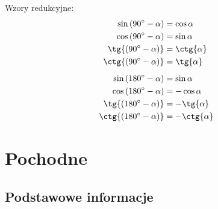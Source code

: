 \documentclass[10pt, twoside, fleqn]{article}
\begin{document}
		Wzory redukcyjne:
			\begin{align*}
				\sin{(90\degree - \alpha)} 	& = \cos{\alpha}		\\
				\cos{(90\degree - \alpha)} 	& = \sin{\alpha}		\\
				 \tg{(90\degree - \alpha)} 	& = \ctg{\alpha}		\\
				\ctg{(90\degree - \alpha)} 	& = \tg{\alpha}			\\[0.5em]
				\sin{(180\degree - \alpha)} & = \sin{\alpha}		\\
				\cos{(180\degree - \alpha)} & = -\cos{\alpha}		\\
				 \tg{(180\degree - \alpha)} & = -\tg{\alpha}		\\
				\ctg{(180\degree - \alpha)} & = -\ctg{\alpha}			
			\end{align*}
			
		\clearpage	
		\newpage
			\section{Pochodne}

	\subsection{Podstawowe informacje}
\end{document}
